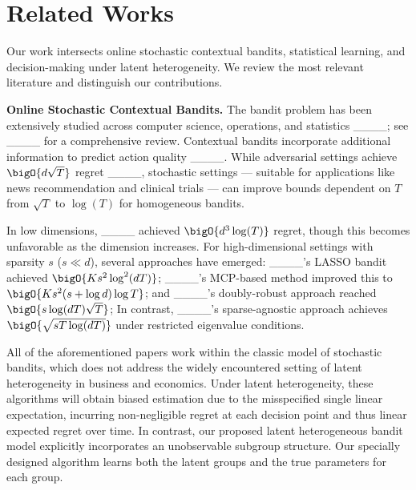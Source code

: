 \section{Related Works}
\label{sec:related-works}

Our work intersects online stochastic contextual bandits, statistical learning, and decision-making under latent heterogeneity. We review the most relevant literature and distinguish our contributions.

\smallskip
\noindent
\textbf{Online Stochastic Contextual Bandits.}
The bandit problem has been extensively studied across computer science, operations, and statistics ____; see ____ for a comprehensive review. Contextual bandits incorporate additional information to predict action quality ____. While adversarial settings achieve $\bigO{d\sqrt{T}}$ regret ____, stochastic settings --- suitable for applications like news recommendation and clinical trials --- can improve bounds dependent on $T$ from $\sqrt{T}$ to $\log(T)$ for homogeneous bandits.

In low dimensions, ____ achieved $\bigO{d^3\log(T)}$ regret, though this becomes unfavorable as the dimension increases. For high-dimensional settings with sparsity $s$ ($s \ll d$), several approaches have emerged: ____'s LASSO bandit achieved $\bigO{K s^2 \log^2(dT)}$; %
____'s MCP-based method improved this to $\bigO{Ks^2(s+\log d)\log T}$; and ____'s doubly-robust approach reached $\bigO{s\log(dT)\sqrt{T}}$; %
In contrast, ____'s sparse-agnostic approach achieves %
$\bigO{\sqrt{sT\log(dT)}}$ under restricted eigenvalue conditions. 

All of the aforementioned papers work within the classic model of stochastic bandits, which does not address the widely encountered setting of latent heterogeneity in business and economics. Under latent heterogeneity, these algorithms will obtain biased estimation due to the misspecified single linear expectation, incurring non-negligible regret at each decision point and thus linear expected regret over time.
In contrast, our proposed latent heterogeneous bandit model explicitly incorporates an unobservable subgroup structure. Our specially designed algorithm learns both the latent groups and the true parameters for each group. 

